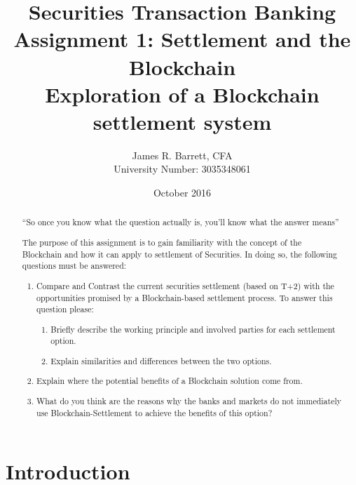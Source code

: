 \documentclass{article}
\title{{\large Securities Transaction Banking\\
    Assignment 1: Settlement and the Blockchain} \\
    {\Large Exploration of a Blockchain settlement system}}
\author{James R. Barrett, CFA \\ University Number: 3035348061}
\date{October 2016}
\begin{document}
\maketitle

\renewcommand\abstractname{Questions}
\begin{abstract}
``So once you know what the question actually is, you'll know what the answer means'' \cite{adams1995hitchhiker}

The purpose of this assignment is to gain familiarity with the concept of the Blockchain and how it can apply to settlement of Securities. In doing so, the following questions must be answered:

\begin{enumerate}
 \item Compare and Contrast the current securities settlement (based on T+2) with the opportunities promised by a Blockchain-based settlement process. To answer this question please:
    \begin{enumerate}
     \item Briefly describe the working principle and involved parties for each settlement option.
     \item Explain similarities and differences between the two options.
    \end{enumerate}
 \item Explain where the potential benefits of a Blockchain solution come from.
 \item What do you think are the reasons why the banks and markets do not immediately use Blockchain-Settlement to achieve the benefits of this option?
\end{enumerate}

\end{abstract}

\newpage

\tableofcontents

\newpage

\section{Introduction}
\end{document}
